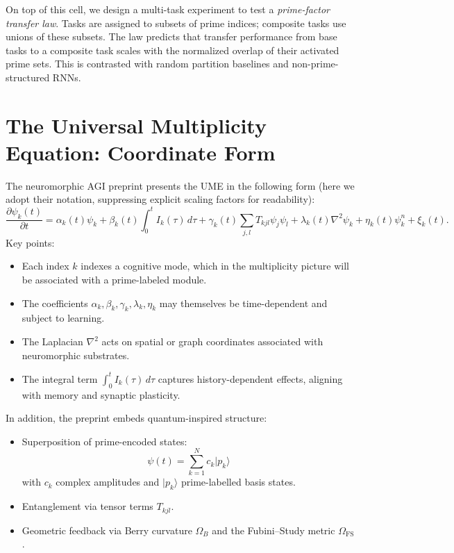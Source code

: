 \documentclass[11pt]{article}
\begin{document}
On top of this cell, we design a multi-task experiment to test a \emph{prime-factor transfer law}. Tasks are assigned to subsets of prime indices; composite tasks use unions of these subsets. The law predicts that transfer performance from base tasks to a composite task scales with the normalized overlap of their activated prime sets. This is contrasted with random partition baselines and non-prime-structured RNNs.

\section{The Universal Multiplicity Equation: Coordinate Form}

The neuromorphic AGI preprint presents the UME in the following form (here we adopt their notation, suppressing explicit scaling factors for readability):
\begin{equation}
\frac{\partial \psi_k(t)}{\partial t}
=
\alpha_k(t)\psi_k
+
\beta_k(t)\int_0^t I_k(\tau)\,d\tau
+
\gamma_k(t)\sum_{j,l} T_{kjl}\psi_j\psi_l
+
\lambda_k(t)\nabla^2\psi_k
+
\eta_k(t)\psi_k^n
+
\xi_k(t).
\end{equation}
Key points:
\begin{itemize}[nosep]
\item Each index $k$ indexes a cognitive mode, which in the multiplicity picture will be associated with a prime-labeled module.
\item The coefficients $\alpha_k, \beta_k, \gamma_k, \lambda_k, \eta_k$ may themselves be time-dependent and subject to learning.
\item The Laplacian $\nabla^2$ acts on spatial or graph coordinates associated with neuromorphic substrates.
\item The integral term $\int_0^t I_k(\tau)\,d\tau$ captures history-dependent effects, aligning with memory and synaptic plasticity.
\end{itemize}

In addition, the preprint embeds quantum-inspired structure:
\begin{itemize}[nosep]
\item Superposition of prime-encoded states:
  \[
  \psi(t) = \sum_{k=1}^N c_k \lvert p_k \rangle
  \]
  with $c_k$ complex amplitudes and $\lvert p_k\rangle$ prime-labelled basis states.
\item Entanglement via tensor terms $T_{kjl}$.
\item Geometric feedback via Berry curvature $\Omega_B$ and the Fubini--Study metric $\Omega_{\mathrm{FS}}$.
\end{itemize}
\end{document}
